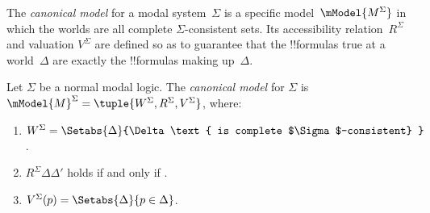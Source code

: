 \documentclass[../../../include/open-logic-section]{subfiles}
\begin{document}

The \emph{canonical model} for a modal system~$\Sigma$ is a specific
model~$\mModel{M^\Sigma}$ in which the worlds are all complete
$\Sigma$-consistent sets. Its accessibility relation~$R^\Sigma$ and
valuation $V^\Sigma$ are defined so as to guarantee that the
!!{formula}s true at a world~$\Delta$ are exactly the !!{formula}s
making up~$\Delta$.

\begin{defn}
  Let $\Sigma$ be a normal modal logic. The \emph{canonical model} for
  $\Sigma$ is $\mModel{M}^\Sigma = \tuple{W^\Sigma, R^\Sigma,
    V^\Sigma}$, where:
  \begin{enumerate}
  \item $W^\Sigma = \Setabs{ \Delta }{\Delta \text{
      is complete $\Sigma$-consistent} }$.
  \item $R^\Sigma \Delta\Delta'$ holds if and only if
    .
  \item $V^\Sigma(p) = \Setabs{\Delta}{p \in \Delta}$.
  \end{enumerate}
\end{defn}
\end{document}

